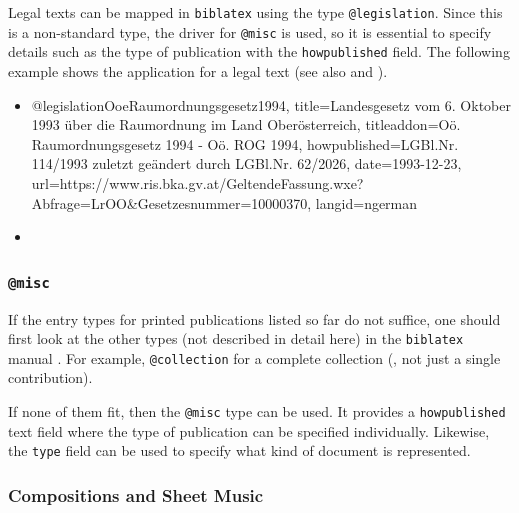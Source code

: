 Legal texts can be mapped in \texttt{biblatex} using the type
\texttt{@legislation}. Since this is a non-standard type, the driver for
\texttt{@misc} is used, so it is essential to specify details such as the type
of publication with the \texttt{howpublished} field. The following example shows
the application for a legal text (see also \cite{FhStG1993} and
\cite{EuRichtlinie2000}).
%
\begin{itemize}
\item[]
\begin{GenericCode}[numbers=none]
@legislation{OoeRaumordnungsgesetz1994,
  title={Landesgesetz vom 6. Oktober 1993 über die Raumordnung im Land Oberösterreich},
  titleaddon={Oö. Raumordnungsgesetz 1994 - Oö. ROG 1994},
  howpublished={LGBl.Nr. 114/1993 zuletzt geändert durch LGBl.Nr. 62/2026},
  date={1993-12-23},
  url={https://www.ris.bka.gv.at/GeltendeFassung.wxe?Abfrage=LrOO&Gesetzesnummer=10000370},
  langid={ngerman}
}
\end{GenericCode}
\item[\cite{OoeRaumordnungsgesetz1994}] 
\end{itemize}
%


\subsubsection{\texttt{\bfseries @misc}}
\label{sec:@misc}

If the entry types for printed publications listed so far do not suffice, one
should first look at the other types (not described in detail here) in the
\texttt{biblatex} manual \cite{Kime2026}. For example, \texttt{@collection} for
a complete collection (\ie, not just a single contribution).

If none of them fit, then the \texttt{@misc} type can be used. It provides a
\texttt{howpublished} text field where the type of publication can be specified
individually. Likewise, the \texttt{type} field can be used to specify what kind
of document is represented.


\subsubsection{Compositions and Sheet Music}
\label{sec:sheet-music}

